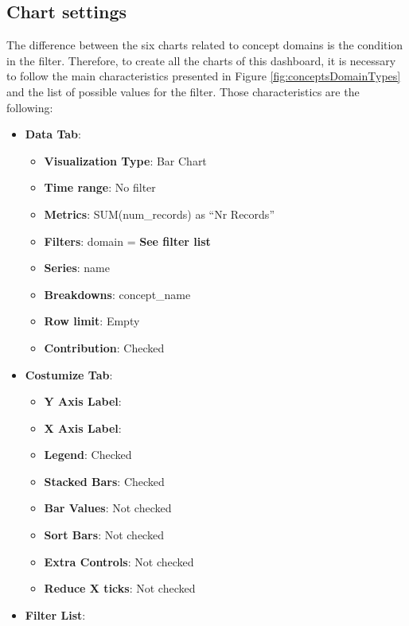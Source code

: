 \documentclass[]{book}
\providecommand{\tightlist}{%
  \setlength{\itemsep}{0pt}\setlength{\parskip}{0pt}}
\begin{document}
\subsection{Chart settings}\label{chart-settings-16}

The difference between the six charts related to concept domains is the
condition in the filter. Therefore, to create all the charts of this
dashboard, it is necessary to follow the main characteristics presented
in Figure \ref{fig:conceptsDomainTypes} and the list of possible values
for the filter. Those characteristics are the following:

\begin{itemize}
\tightlist
\item
  \textbf{Data Tab}:

  \begin{itemize}
  \tightlist
  \item
    \textbf{Visualization Type}: Bar Chart
  \item
    \textbf{Time range}: No filter
  \item
    \textbf{Metrics}: SUM(num\_records) as ``Nr Records''
  \item
    \textbf{Filters}: domain = \textbf{See filter list}
  \item
    \textbf{Series}: name
  \item
    \textbf{Breakdowns}: concept\_name
  \item
    \textbf{Row limit}: Empty
  \item
    \textbf{Contribution}: Checked
  \end{itemize}
\item
  \textbf{Costumize Tab}:

  \begin{itemize}
  \tightlist
  \item
    \textbf{Y Axis Label}:
  \item
    \textbf{X Axis Label}:
  \item
    \textbf{Legend}: Checked
  \item
    \textbf{Stacked Bars}: Checked
  \item
    \textbf{Bar Values}: Not checked
  \item
    \textbf{Sort Bars}: Not checked
  \item
    \textbf{Extra Controls}: Not checked
  \item
    \textbf{Reduce X ticks}: Not checked
  \end{itemize}
\item
  \textbf{Filter List}:


\end{itemize}
\end{document}
